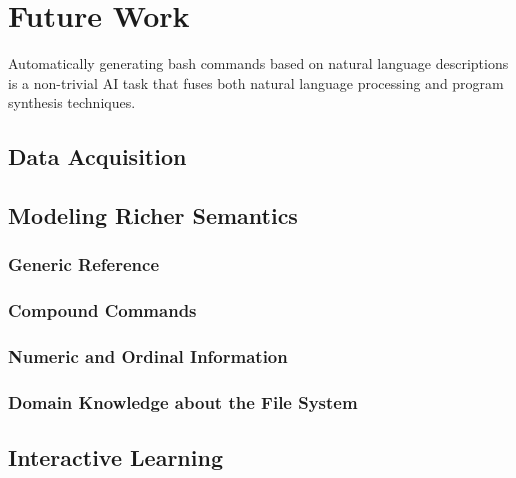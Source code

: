 \section{Future Work}

Automatically generating bash commands based on natural language descriptions is a non-trivial AI task that fuses both natural language processing and program synthesis techniques. 

\subsection{Data Acquisition}

\subsection{Modeling Richer Semantics}
\label{future:semantics}
\subsubsection{Generic Reference}
\subsubsection{Compound Commands}
\subsubsection{Numeric and Ordinal Information}
\subsubsection{Domain Knowledge about the File System}

\subsection{Interactive Learning}